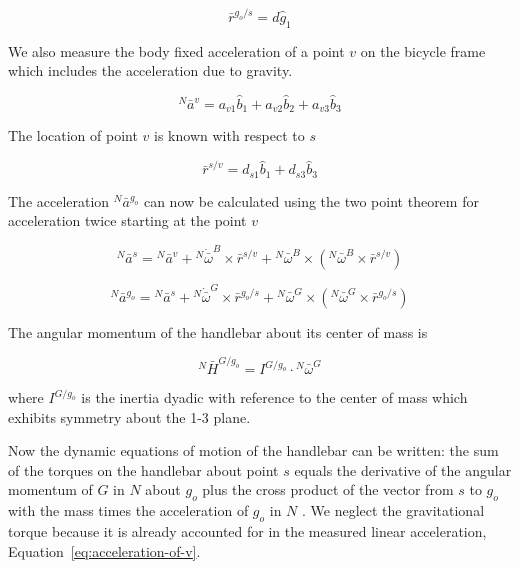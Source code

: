 \documentclass[10pt]{article}
\begin{document}
\begin{equation}
  \bar{r}^{g_o/s} = d\hat{g}_1
\end{equation}

We also measure the body fixed acceleration of a point $v$ on the bicycle frame
which includes the acceleration due to gravity.

\begin{equation}
  ^N\bar{a}^v = a_{v1}\hat{b}_1 + a_{v2}\hat{b}_2 + a_{v3}\hat{b}_3
  \label{eq:acceleration-of-v}
\end{equation}

The location of point $v$ is known with respect to $s$

\begin{equation}
  \bar{r}^{s/v} = d_{s1}\hat{b}_1 + d_{s3}\hat{b}_3
\end{equation}

The acceleration $^N\bar{a}^{g_o}$ can now be calculated using the two point
theorem for acceleration \cite{Kane1985} twice starting at the point $v$

\begin{equation}
  ^N\bar{a}^s = {}^N\bar{a}^v +
    {}^N\dot{\bar{\omega}}^B\times\bar{r}^{s/v} +
    {}^N\bar{\omega}^B\times({}^N\bar{\omega}^B\times\bar{r}^{s/v})
\end{equation}

\begin{equation}
  ^N\bar{a}^{g_o} = {}^N\bar{a}^s +
    {}^N\dot{\bar{\omega}}^G\times\bar{r}^{g_o/s} +
    {}^N\bar{\omega}^G\times({}^N\bar{\omega}^G\times\bar{r}^{g_o/s})
\end{equation}

The angular momentum of the handlebar about its center of mass is

\begin{equation}
  ^N\bar{H}^{G/g_o} = I^{G/g_o} \cdot {}^N\bar{\omega}^G
\end{equation}

where $I^{G/g_o}$ is the inertia dyadic with reference to the center of mass
which exhibits symmetry about the 1-3 plane.

Now the dynamic equations of motion of the handlebar can be written: the sum of
the torques on the handlebar about point $s$ equals the derivative of the
angular momentum of $G$ in $N$ about $g_o$ plus the cross product of the vector
from $s$ to $g_o$ with the mass times the acceleration of $g_o$ in $N$
\cite{Meriam1975}. We neglect the gravitational torque because it is already
accounted for in the measured linear acceleration,
Equation~\ref{eq:acceleration-of-v}.
\end{document}
